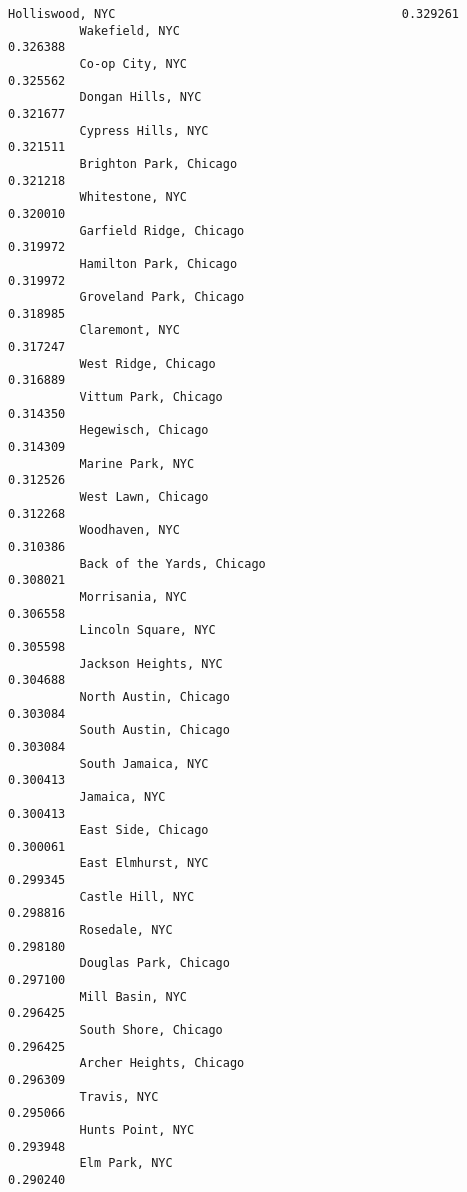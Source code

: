 \documentclass[11pt]{article}
\begin{document}
\begin{Verbatim}[commandchars=\\\{\}]
          Holliswood, NYC                                        0.329261
          Wakefield, NYC                                         0.326388
          Co-op City, NYC                                        0.325562
          Dongan Hills, NYC                                      0.321677
          Cypress Hills, NYC                                     0.321511
          Brighton Park, Chicago                                 0.321218
          Whitestone, NYC                                        0.320010
          Garfield Ridge, Chicago                                0.319972
          Hamilton Park, Chicago                                 0.319972
          Groveland Park, Chicago                                0.318985
          Claremont, NYC                                         0.317247
          West Ridge, Chicago                                    0.316889
          Vittum Park, Chicago                                   0.314350
          Hegewisch, Chicago                                     0.314309
          Marine Park, NYC                                       0.312526
          West Lawn, Chicago                                     0.312268
          Woodhaven, NYC                                         0.310386
          Back of the Yards, Chicago                             0.308021
          Morrisania, NYC                                        0.306558
          Lincoln Square, NYC                                    0.305598
          Jackson Heights, NYC                                   0.304688
          North Austin, Chicago                                  0.303084
          South Austin, Chicago                                  0.303084
          South Jamaica, NYC                                     0.300413
          Jamaica, NYC                                           0.300413
          East Side, Chicago                                     0.300061
          East Elmhurst, NYC                                     0.299345
          Castle Hill, NYC                                       0.298816
          Rosedale, NYC                                          0.298180
          Douglas Park, Chicago                                  0.297100
          Mill Basin, NYC                                        0.296425
          South Shore, Chicago                                   0.296425
          Archer Heights, Chicago                                0.296309
          Travis, NYC                                            0.295066
          Hunts Point, NYC                                       0.293948
          Elm Park, NYC                                          0.290240

\end{Verbatim}
\end{document}
